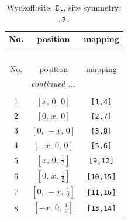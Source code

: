 \documentclass[fleqn,8pt]{jsarticle}
\begin{document}
\begin{longtable}{ccc}
\caption{Wyckoff site: {\tt 8l}, site symmetry: {\tt .2.}}
 \\
 \hline \hline
No. & position & mapping \\ \hline \endfirsthead

\multicolumn{2}{l}{\tablename\ \thetable{}} \\
 \hline \hline
No. & position & mapping \\ \hline \endhead

 \hline \hline
\multicolumn{2}{r}{\footnotesize\it continued ...} \\ \endfoot

 \hline \hline
\multicolumn{2}{r}{} \\ \endlastfoot

1 & $\left[ x,\, 0,\, 0 \right]$ & {\tt [1,4]} \\ \hline
2 & $\left[ 0,\, x,\, 0 \right]$ & {\tt [2,7]} \\ \hline
3 & $\left[ 0,\, - x,\, 0 \right]$ & {\tt [3,8]} \\ \hline
4 & $\left[ - x,\, 0,\, 0 \right]$ & {\tt [5,6]} \\ \hline
5 & $\left[ x,\, 0,\, \frac{1}{2} \right]$ & {\tt [9,12]} \\ \hline
6 & $\left[ 0,\, x,\, \frac{1}{2} \right]$ & {\tt [10,15]} \\ \hline
7 & $\left[ 0,\, - x,\, \frac{1}{2} \right]$ & {\tt [11,16]} \\ \hline
8 & $\left[ - x,\, 0,\, \frac{1}{2} \right]$ & {\tt [13,14]} \\
\end{longtable}
\renewcommand{\arraystretch}{1.2}
\end{document}
